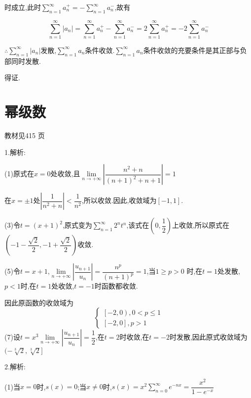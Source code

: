 时成立,此时$\sum\limits_{n = 1}^\infty  {a_n^ + }  =  - \sum\limits_{n = 1}^\infty  {a_n^ - } $,故有

\[\sum\limits_{n = 1}^\infty  {\left| {{a_n}} \right|}  = \sum\limits_{n = 1}^\infty  {a_n^ + }  - \sum\limits_{n = 1}^\infty  {a_n^ - }  = 2\sum\limits_{n = 1}^\infty  {a_n^ + }  =  - 2\sum\limits_{n = 1}^\infty  {a_n^ - } \]

$\therefore \sum\limits_{n = 1}^\infty  {\left| {{a_n}} \right|} $发散,$\sum\limits_{n = 1}^\infty  {{a_n}} $条件收敛.$\sum\limits_{n = 1}^\infty  {{a_n}} $条件收敛的充要条件是其正部与负部同时发散.

得证.

\section{幂级数}
\begin{flushright}
  \color{zhanqing!80}
   教材见415 页 %
\end{flushright}
1.解析:

(1)原式在$x = 0$处收敛,且$\lim\limits_{n \to +\infty} \left| {\dfrac{{{n^2} + n}}{{{{(n + 1)}^2} + n + 1}}} \right| = 1$

在$x =  \pm 1$处$\left| {\dfrac{1}{{{n^2} + n}}} \right| < \dfrac{1}{{{n^2}}}$,所以收敛.因此,收敛域为$[ - 1,1]$.

(3)令$t = {(x + 1)^2}$,原式变为$\sum\limits_{n = 1}^\infty  {{2^n}{t^n}} $,该式在$(0,\dfrac{1}{2})$上收敛,所以原式在$( - 1 - \dfrac{{\sqrt 2 }}{2}, - 1 + \dfrac{{\sqrt 2 }}{2})$收敛.

(5)令$t = x + 1$,$\lim\limits_{n \to +\infty} \left| {\dfrac{{{u_{n + 1}}}}{{{u_n}}}} \right| = \dfrac{{{n^p}}}{{{{(n + 1)}^p}}} = 1$,当$1 \geqslant p > 0$
时,在$t = 1$处发散,$p < 1$时,在$t = 1$处收敛,$t = - 1$时函数都收敛.

因此原函数的收敛域为
\[\left\{ {\begin{array}{*{20}{c}}
  {\left[ { - 2,0} \right),0 < p \leqslant 1} \\
  {\left[ { - 2,0} \right],p > 1}
\end{array}} \right.\]
(7)设$t = {x^3}$$\lim\limits_{n \to +\infty} \left| {\dfrac{{{u_{n + 1}}}}{{{u_n}}}} \right| = \dfrac{1}{2}$,在$t = 2$时收敛,在$t = - 2$时发散,因此原式收敛域为$( - \sqrt[3]{2},\sqrt[3]{2}]$

2.解析:

(1)当$x = 0$时,$s(x) = 0$;当$x \ne 0$时,$s(x) = {x^2}\sum\limits_{n = 0}^\infty  {{e^{ - nx}}}  = \dfrac{{{x^2}}}{{1 - {e^{ - x}}}}$

